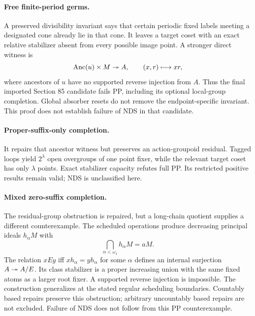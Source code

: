 \paragraph{Free finite-period germs.}
A preserved divisibility invariant says that certain periodic fixed labels meeting a designated cone already lie in that cone. It leaves a target coset with an exact relative stabilizer absent from every possible image point. A stronger direct witness is
\[
\operatorname{Anc}(u)\times M\twoheadrightarrow A,\qquad (x,r)\longmapsto xr,
\]
where ancestors of $u$ have no supported reverse injection from $A$. Thus the final imported Section 85 candidate fails PP, including its optional local-group completion. Global absorber resets do not remove the endpoint-specific invariant. This proof does not establish failure of NDS in that candidate.

\paragraph{Proper-suffix-only completion.}
It repairs that ancestor witness but preserves an action-groupoid residual. Tagged loops yield $2^\lambda$ open overgroups of one point fixer, while the relevant target coset has only $\lambda$ points. Exact stabilizer capacity refutes full PP. Its restricted positive results remain valid; NDS is unclassified here.

\paragraph{Mixed zero-suffix completion.}
The residual-group obstruction is repaired, but a long-chain quotient supplies a different counterexample. The scheduled operations produce decreasing principal ideals $h_\alpha M$ with
\[
\bigcap_{\alpha<\omega_1}h_\alpha M=aM.
\]
The relation $xEy$ iff $xh_\alpha=yh_\alpha$ for some $\alpha$ defines an internal surjection $A\twoheadrightarrow A/E$. Its class stabilizer is a proper increasing union with the same fixed atoms as a larger root fixer. A supported reverse injection is impossible. The construction generalizes at the stated regular scheduling boundaries. Countably based repairs preserve this obstruction; arbitrary uncountably based repairs are not excluded. Failure of NDS does not follow from this PP counterexample.

